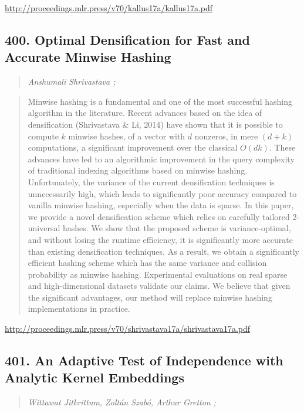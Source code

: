 \documentclass{article}
\begin{document}
\href{http://proceedings.mlr.press/v70/kallus17a/kallus17a.pdf}{http://proceedings.mlr.press/v70/kallus17a/kallus17a.pdf}

\subsection{400. Optimal Densification for Fast and Accurate Minwise Hashing}

\begin{quote}
\footnotesize{\textit{Anshumali Shrivastava ;}}
\end{quote}

\begin{quote}
    Minwise hashing is a fundamental and one of the most successful hashing algorithm in the literature. Recent advances based on the idea of densification (Shrivastava \& Li, 2014) have shown that it is possible to compute $k$ minwise hashes, of a vector with $d$ nonzeros, in mere $(d + k)$ computations, a significant improvement over the classical $O(dk)$. These advances have led to an algorithmic improvement in the query complexity of traditional indexing algorithms based on minwise hashing. Unfortunately, the variance of the current densification techniques is unnecessarily high, which leads to significantly poor accuracy compared to vanilla minwise hashing, especially when the data is sparse. In this paper, we provide a novel densification scheme which relies on carefully tailored 2-universal hashes. We show that the proposed scheme is variance-optimal, and without losing the runtime efficiency, it is significantly more accurate than existing densification techniques. As a result, we obtain a significantly efficient hashing scheme which has the same variance and collision probability as minwise hashing. Experimental evaluations on real sparse and high-dimensional datasets validate our claims. We believe that given the significant advantages, our method will replace minwise hashing implementations in practice.  \end{quote}

\href{http://proceedings.mlr.press/v70/shrivastava17a/shrivastava17a.pdf}{http://proceedings.mlr.press/v70/shrivastava17a/shrivastava17a.pdf}

\subsection{401. An Adaptive Test of Independence with Analytic Kernel Embeddings}

\begin{quote}
\footnotesize{\textit{Wittawat Jitkrittum, Zoltán Szabó, Arthur Gretton ;}}
\end{quote}
\end{document}
